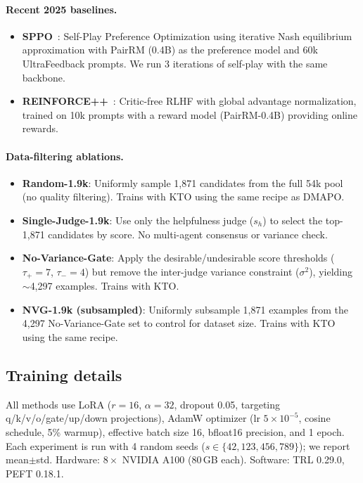 \documentclass{article}
\newcommand{\method}{DMAPO}
\begin{document}
\paragraph{Recent 2025 baselines.}
\begin{itemize}[nosep,leftmargin=*]
    \item \textbf{SPPO}~\citep{wu2024sppo}: Self-Play Preference Optimization using iterative Nash equilibrium approximation with PairRM (0.4B) as the preference model and 60k UltraFeedback prompts. We run 3 iterations of self-play with the same backbone.
    \item \textbf{REINFORCE++}~\citep{hu2025reinforceplusplus}: Critic-free RLHF with global advantage normalization, trained on 10k prompts with a reward model (PairRM-0.4B) providing online rewards.
\end{itemize}

\paragraph{Data-filtering ablations.}
\begin{itemize}[nosep,leftmargin=*]
    \item \textbf{Random-1.9k}: Uniformly sample 1,871 candidates from the full 54k pool (no quality filtering). Trains with KTO using the same recipe as \method{}.
    \item \textbf{Single-Judge-1.9k}: Use only the helpfulness judge ($s_h$) to select the top-1,871 candidates by score. No multi-agent consensus or variance check.
    \item \textbf{No-Variance-Gate}: Apply the desirable/undesirable score thresholds ($\tau_+{=}7$, $\tau_-{=}4$) but remove the inter-judge variance constraint ($\sigma^2$), yielding $\sim$4,297 examples. Trains with KTO.
    \item \textbf{NVG-1.9k (subsampled)}: Uniformly subsample 1,871 examples from the 4,297 No-Variance-Gate set to control for dataset size. Trains with KTO using the same recipe.
\end{itemize}

\subsection{Training details}

All methods use LoRA ($r{=}16$, $\alpha{=}32$, dropout 0.05, targeting q/k/v/o/gate/up/down projections), AdamW optimizer (lr $5{\times}10^{-5}$, cosine schedule, 5\% warmup), effective batch size 16, bfloat16 precision, and 1 epoch. Each experiment is run with 4 random seeds ($s \in \{42, 123, 456, 789\}$); we report mean$\pm$std. Hardware: $8\times$ NVIDIA A100 ($80$\,GB each). Software: TRL 0.29.0, PEFT 0.18.1.
\end{document}
